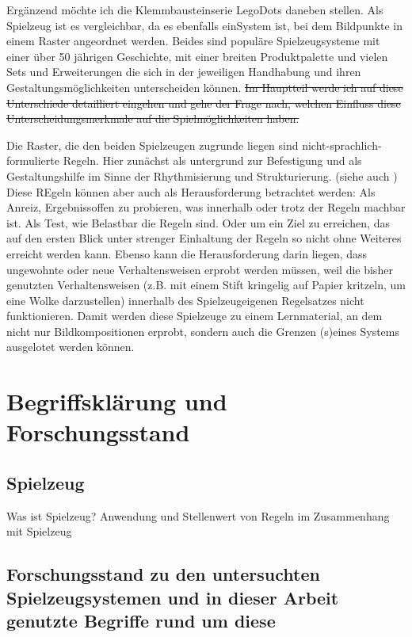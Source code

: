 \documentclass[11pt,a4paper,twoside]{scrreprt}
\begin{document}
Ergänzend möchte ich die Klemmbausteinserie Lego\texttrademark Dots daneben stellen. Als Spielzeug ist es vergleichbar, da es ebenfalls einSystem ist, bei dem Bildpunkte in einem Raster angeordnet werden. Beides sind populäre Spielzeugsysteme mit einer über 50 jährigen Geschichte, mit einer breiten Produktpalette und vielen Sets und Erweiterungen die sich in der jeweiligen Handhabung und ihren Gestaltungsmöglichkeiten unterscheiden können.
\sout{Im Hauptteil werde ich auf diese Unterschiede detailliert eingehen und gehe der Frage nach, welchen Einfluss diese Unterscheidungsmerkmale auf die Spielmöglichkeiten haben.}

Die Raster, die den beiden Spielzeugen zugrunde liegen sind nicht-sprachlich-formulierte Regeln. Hier zunächst als untergrund zur Befestigung und als Gestaltungshilfe im Sinne der Rhythmisierung und Strukturierung. (siehe auch \cite{formfindung})
Diese REgeln können aber auch als Herausforderung betrachtet werden: Als Anreiz, Ergebnissoffen zu probieren, was innerhalb oder trotz der Regeln machbar ist. Als Test, wie Belastbar die Regeln sind. Oder um ein Ziel zu erreichen, das auf den ersten Blick unter strenger Einhaltung der Regeln so nicht ohne Weiteres erreicht werden kann. Ebenso kann die Herausforderung darin liegen, dass ungewohnte oder neue Verhaltensweisen erprobt werden müssen, weil die bisher genutzten Verhaltensweisen (z.B. mit einem Stift kringelig auf Papier kritzeln, um eine Wolke darzustellen) innerhalb des Spielzeugeigenen Regelsatzes nicht funktionieren. Damit werden diese Spielzeuge zu einem Lernmaterial, an dem nicht nur Bildkompositionen erprobt, sondern auch die Grenzen (s)eines Systems ausgelotet werden können.


\iffalse

\chapter{Begriffsklärung und Forschungsstand}

	\section{Spielzeug}
	Was ist Spielzeug? Anwendung und Stellenwert von Regeln im Zusammenhang mit Spielzeug
	
	\section{Forschungsstand zu den untersuchten Spielzeugsystemen und in dieser Arbeit genutzte Begriffe rund um diese}
\end{document}
